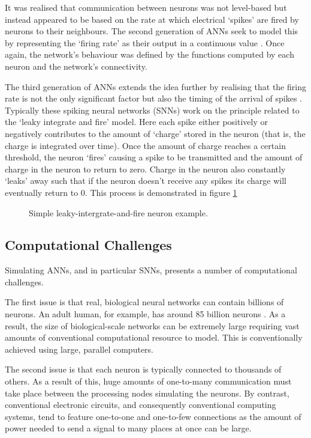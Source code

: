 			It was realised that communication between neurons was not level-based but
			instead appeared to be based on the rate at which electrical `spikes' are
			fired by neurons to their neighbours. The second generation of ANNs seek
			to model this by representing the `firing rate' as their output in a
			continuous value \cite{maass97}. Once again, the network's behaviour was
			defined by the functions computed by each neuron and the network's
			connectivity.
			
			The third generation of ANNs extends the idea further by realising that
			the firing rate is not the only significant factor but also the timing of
			the arrival of spikes \cite{maass01}. Typically these spiking neural
			networks (SNNs) work on the principle related to the `leaky integrate and
			fire' model. Here each spike either positively or negatively contributes
			to the amount of `charge' stored in the neuron (that is, the charge is
			integrated over time). Once the amount of charge reaches a certain
			threshold, the neuron `fires' causing a spike to be transmitted and the
			amount of charge in the neuron to return to zero. Charge in the neuron
			also constantly `leaks' away such that if the neuron doesn't receive any
			spikes its charge will eventually return to 0. This process is
			demonstrated in figure \ref{fig:snn-example}
			
			\begin{figure}
				\center
				
				\caption{Simple leaky-intergrate-and-fire neuron example.}
				\label{fig:snn-example}
			\end{figure}
		
		\subsection{Computational Challenges}
			
			Simulating ANNs, and in particular SNNs, presents a number of
			computational challenges.
			
			The first issue is that real, biological neural networks can contain
			billions of neurons. An adult human, for example, has around 85 billion
			neurons \cite{herculano09}. As a result, the size of biological-scale
			networks can be extremely large requiring vast amounts of conventional
			computational resource to model. This is conventionally achieved using
			large, parallel computers.
			
			The second issue is that each neuron is typically connected to thousands
			of others. As a result of this, huge amounts of one-to-many communication
			must take place between the processing nodes simulating the neurons.  By
			contrast, conventional electronic circuits, and consequently conventional
			computing systems, tend to feature one-to-one and one-to-few connections
			as the amount of power needed to send a signal to many places at once can
			be large.
			
